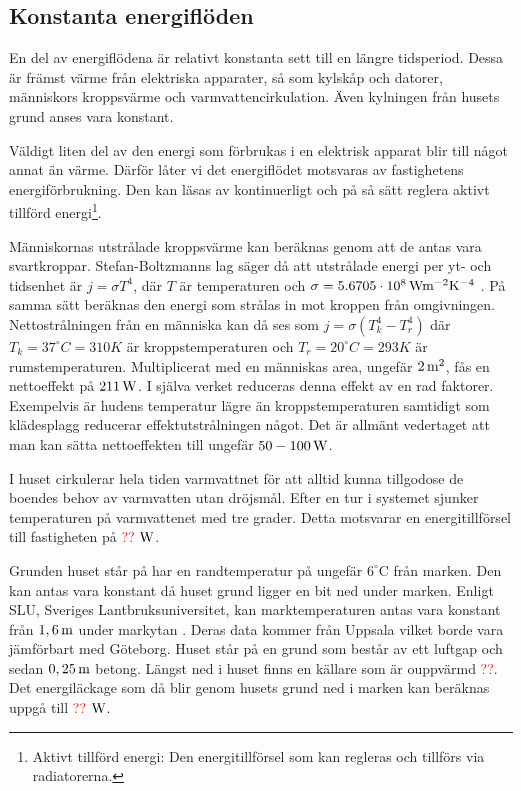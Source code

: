 \subsection{Konstanta energiflöden}

En del av energiflödena är relativt konstanta sett till en längre tidsperiod. Dessa är främst värme från elektriska apparater, så som kylskåp och datorer, människors kroppsvärme och varmvattencirkulation. Även kylningen från husets grund anses vara konstant.

Väldigt liten del av den energi som förbrukas i en elektrisk apparat blir till något annat än värme. Därför låter vi det energiflödet motsvaras av fastighetens energiförbrukning. Den kan läsas av kontinuerligt och på så sätt reglera aktivt tillförd energi\footnote{Aktivt tillförd energi: Den energitillförsel som kan regleras och tillförs via radiatorerna.}.

Människornas utstrålade kroppsvärme kan beräknas genom att de antas vara svartkroppar. Stefan-Boltzmanns lag säger då att utstrålade energi per yt- och tidsenhet är $j=\sigma T^4$, där $T$ är temperaturen och $\sigma=\unit[5.6705\cdot 10^8]{Wm^{-2}K^{-4}}$ \cite{physicshandbook}. På samma sätt beräknas den energi som strålas in mot kroppen från omgivningen. Nettostrålningen från en människa kan då ses som $j=\sigma \left( T_k^4 - T_r^4 \right)$ där $T_k=37^{\circ}C=310K$ är kroppstemperaturen och $T_r=20^{\circ}C=293K$ är rumstemperaturen. Multiplicerat med en människas area, ungefär $\unit[2]{m^2}$, fås en nettoeffekt på $\unit[211]{W}$. I själva verket reduceras denna effekt av en rad faktorer. Exempelvis är hudens temperatur lägre än kroppstemperaturen samtidigt som klädesplagg reducerar effektutstrålningen något. Det är allmänt vedertaget att man kan sätta nettoeffekten till ungefär $\unit[50-100]{W}$.

I huset cirkulerar hela tiden varmvattnet för att alltid kunna tillgodose de boendes behov av varmvatten utan dröjsmål. Efter en tur i systemet sjunker temperaturen på varmvattenet med tre grader. Detta motsvarar en energitillförsel till fastigheten på \textcolor{red}{??} $\unit[]{W}$.

Grunden huset står på har en randtemperatur på ungefär $6^{\circ}\mbox{C}$ från marken. Den kan antas vara konstant då huset grund ligger en bit ned under marken. Enligt SLU, Sveriges Lantbruksuniversitet, kan marktemperaturen antas vara konstant från $\unit[1,6]{m}$ under markytan \cite{SLU}. Deras data kommer från Uppsala vilket borde vara jämförbart med Göteborg. Huset står på en grund som består av ett luftgap och sedan $\unit[0,25]{m}$ betong. Längst ned i huset finns en källare som är ouppvärmd \textcolor{red}{??}. Det energiläckage som då blir genom husets grund ned i marken kan beräknas uppgå till \textcolor{red}{??} $\unit[]{W}$.
